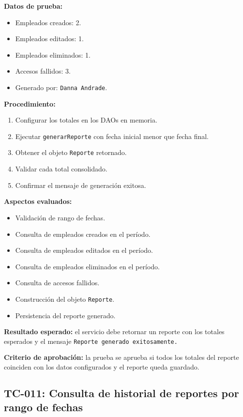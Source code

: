 \documentclass[12pt,a4paper]{article}
\begin{document}
\textbf{Datos de prueba:}
\begin{itemize}[leftmargin=*]
    \item Empleados creados: 2.
    \item Empleados editados: 1.
    \item Empleados eliminados: 1.
    \item Accesos fallidos: 3.
    \item Generado por: \texttt{Danna Andrade}.
\end{itemize}

\textbf{Procedimiento:}
\begin{enumerate}[leftmargin=*]
    \item Configurar los totales en los DAOs en memoria.
    \item Ejecutar \texttt{generarReporte} con fecha inicial menor que fecha final.
    \item Obtener el objeto \texttt{Reporte} retornado.
    \item Validar cada total consolidado.
    \item Confirmar el mensaje de generación exitosa.
\end{enumerate}

\textbf{Aspectos evaluados:}
\begin{itemize}[leftmargin=*]
    \item Validación de rango de fechas.
    \item Consulta de empleados creados en el período.
    \item Consulta de empleados editados en el período.
    \item Consulta de empleados eliminados en el período.
    \item Consulta de accesos fallidos.
    \item Construcción del objeto \texttt{Reporte}.
    \item Persistencia del reporte generado.
\end{itemize}

\textbf{Resultado esperado:} el servicio debe retornar un reporte con los totales esperados y el mensaje \texttt{Reporte generado exitosamente.}

\textbf{Criterio de aprobación:} la prueba se aprueba si todos los totales del reporte coinciden con los datos configurados y el reporte queda guardado.

\subsection{TC-011: Consulta de historial de reportes por rango de fechas}
\end{document}
